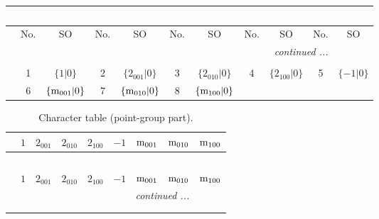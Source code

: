 \documentclass[fleqn,10pt,landscape]{article}
\begin{document}
\begin{itemize}
\begin{center}
\begin{longtable}{c|cc|cc|cc|cc|cc}
\multicolumn{10}{l}{\tablename\ \thetable{}} \\
 \hline \hline
 & No. & SO & No. & SO & No. & SO & No. & SO & No. & SO \\ \hline \endhead

 \hline \hline
\multicolumn{10}{r}{\footnotesize\it continued ...} \\ \endfoot

 \hline \hline
\multicolumn{10}{r}{} \\ \endlastfoot

 & 1 & $\{1|0\}$ & 2 & $\{2{}_{001}|0\}$ & 3 & $\{2{}_{010}|0\}$ & 4 & $\{2{}_{100}|0\}$ & 5 & $\{-1|0\}$ \\
& 6 & $\{{\rm m}_{001}|0\}$ & 7 & $\{{\rm m}_{010}|0\}$ & 8 & $\{{\rm m}_{100}|0\}$ &  &  &  &  \\
\end{longtable}
\end{center}
\begin{center}
\renewcommand{\arraystretch}{1.0}
\begin{longtable}{c|rrrrrrrr}
\caption{Character table (point-group part).}
 \\
 \hline \hline
 & $ 1 $ & $ 2{}_{001} $ & $ 2{}_{010} $ & $ 2{}_{100} $ & $ -1 $ & $ {\rm m}_{001} $ & $ {\rm m}_{010} $ & $ {\rm m}_{100} $ \\ \hline \endfirsthead

\multicolumn{8}{l}{\tablename\ \thetable{}} \\
 \hline \hline
 & $ 1 $ & $ 2{}_{001} $ & $ 2{}_{010} $ & $ 2{}_{100} $ & $ -1 $ & $ {\rm m}_{001} $ & $ {\rm m}_{010} $ & $ {\rm m}_{100} $ \\ \hline \endhead

 \hline \hline
\multicolumn{8}{r}{\footnotesize\it continued ...} \\ \endfoot

 \hline \hline
\multicolumn{8}{r}{} \\ \endlastfoot


\end{longtable}
\end{center}
\end{itemize}
\end{document}
